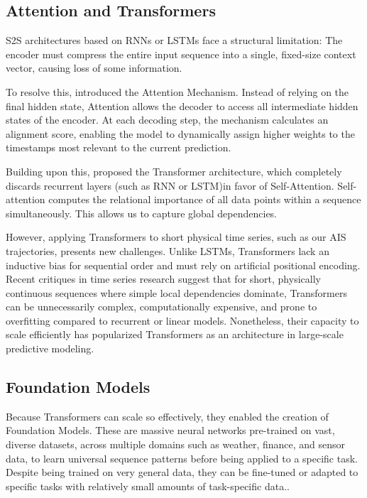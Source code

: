 \subsection{Attention and Transformers}
   \ac{S2S} architectures based on \acp{RNN} or \acp{LSTM} face a structural limitation: The encoder must compress the entire input sequence into a single, fixed-size context vector, causing loss of some information.

    To resolve this, \cite{bahdanau2016neuralmachinetranslationjointly} introduced the Attention Mechanism. Instead of relying on the final hidden state, Attention allows the decoder to access all intermediate hidden states of the encoder. At each decoding step, the mechanism calculates an alignment score, enabling the model to dynamically assign higher weights to the timestamps most relevant to the current prediction.

    Building upon this, \cite{attentioniayn} proposed the Transformer architecture, which completely discards recurrent layers (such as \ac{RNN} or \ac{LSTM})in favor of Self-Attention. Self-attention computes the relational importance of all data points within a sequence simultaneously. This allows us to capture global dependencies.

    However, applying Transformers to short physical time series, such as our \ac{AIS} trajectories, presents new challenges. Unlike \acp{LSTM}, Transformers lack an inductive bias for sequential order and must rely on artificial positional encoding. Recent critiques in time series research \cite{zeng2022transformerseffectivetimeseries}  suggest that for short, physically continuous sequences where simple local dependencies dominate, Transformers can be unnecessarily complex, computationally expensive, and prone to overfitting compared to recurrent or linear models. 
    Nonetheless, their capacity to scale efficiently has popularized  Transformers as an architecture in large-scale predictive modeling. %
    
\subsection{Foundation Models}
    Because Transformers can scale so effectively, they enabled the creation of Foundation Models. These are massive neural networks pre-trained on vast, diverse datasets, across multiple domains such as weather, finance, and sensor data, to learn universal sequence patterns before being applied to a specific task. Despite being trained on very general data, they can be fine-tuned or adapted to specific tasks with relatively small amounts of task-specific data.\cite{Liang_2024foundation}.


